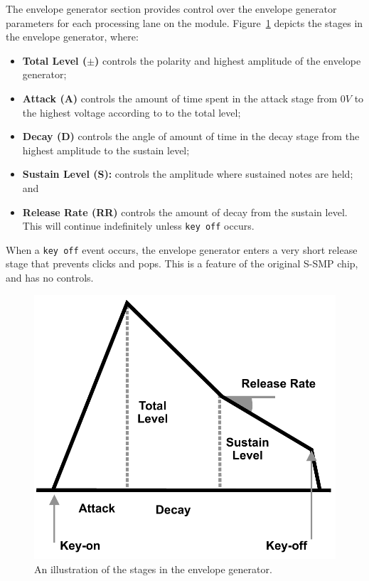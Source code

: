 \documentclass[12pt,letter]{article}
\begin{document}
The envelope generator section provides control over the envelope generator parameters for each processing lane on the module. Figure~\ref{fig:envelope-generator} depicts the stages in the envelope generator, where:
\begin{itemize}
 \item \textbf{Total Level ($\pm$)} controls the polarity and highest amplitude of the envelope generator;
 \item \textbf{Attack (A)} controls the amount of time spent in the attack stage from $0V$ to the highest voltage according to to the total level;
 \item \textbf{Decay (D)} controls the angle of amount of time in the decay stage from the highest amplitude to the sustain level;
 \item \textbf{Sustain Level (S):} controls the amplitude where sustained notes are held; and
 \item \textbf{Release Rate (RR)} controls the amount of decay from the sustain level. This will continue indefinitely unless \texttt{key off} occurs.
\end{itemize}
When a \texttt{key off} event occurs, the envelope generator enters a very short release stage that prevents clicks and pops. This is a feature of the original S-SMP chip, and has no controls.

\begin{figure}[!htp]
\centering
\caption{An illustration of the stages in the envelope generator.}
\label{fig:envelope-generator}
\includegraphics[width=\maxwidth{\textwidth}]{img/Envelope}
\end{figure}
\end{document}
